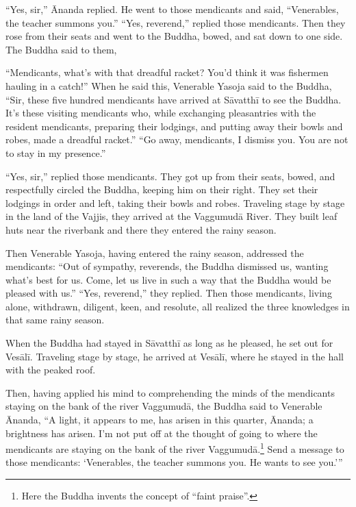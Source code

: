 \documentclass[12pt,openany]{book}%
\begin{document}
“Yes, sir,” Ānanda replied. He went to those mendicants and said, “Venerables, the teacher summons you.” “Yes, reverend,” replied those mendicants. Then they rose from their seats and went to the Buddha, bowed, and sat down to one side. The Buddha said to them, 

“Mendicants, what’s with that dreadful racket? You’d think it was fishermen hauling in a catch!” When he said this, Venerable Yasoja said to the Buddha, “Sir, these five hundred mendicants have arrived at \textsanskrit{Sāvatthī} to see the Buddha. It’s these visiting mendicants who, while exchanging pleasantries with the resident mendicants, preparing their lodgings, and putting away their bowls and robes, made a dreadful racket.” “Go away, mendicants, I dismiss you. You are not to stay in my presence.” 

“Yes, sir,” replied those mendicants. They got up from their seats, bowed, and respectfully circled the Buddha, keeping him on their right. They set their lodgings in order and left, taking their bowls and robes. Traveling stage by stage in the land of the Vajjis, they arrived at the \textsanskrit{Vaggumudā} River. They built leaf huts near the riverbank and there they entered the rainy season. 

Then Venerable Yasoja, having entered the rainy season, addressed the mendicants: “Out of sympathy, reverends, the Buddha dismissed us, wanting what’s best for us. Come, let us live in such a way that the Buddha would be pleased with us.” “Yes, reverend,” they replied. Then those mendicants, living alone, withdrawn, diligent, keen, and resolute, all realized the three knowledges in that same rainy season. 

When the Buddha had stayed in \textsanskrit{Sāvatthī} as long as he pleased, he set out for \textsanskrit{Vesālī}. Traveling stage by stage, he arrived at \textsanskrit{Vesālī}, where he stayed in the hall with the peaked roof. 

Then, having applied his mind to comprehending the minds of the mendicants staying on the bank of the river \textsanskrit{Vaggumudā}, the Buddha said to Venerable Ānanda, “A light, it appears to me, has arisen in this quarter, Ānanda; a brightness has arisen. I’m not put off at the thought of going to where the mendicants are staying on the bank of the river \textsanskrit{Vaggumudā}.\footnote{Here the Buddha invents the concept of “faint praise”. } Send a message to those mendicants: ‘Venerables, the teacher summons you. He wants to see you.’” 
\end{document}

